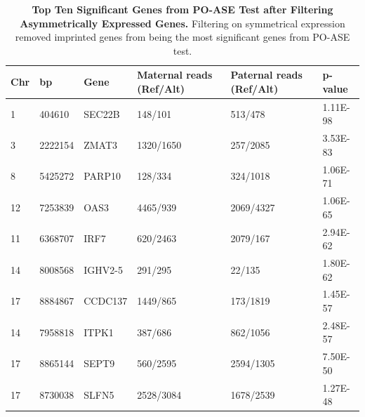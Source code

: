 \begin{table}[!htb]
\centering
\begin{adjustbox}{width={\textwidth}}
\begin{tabular}{@{}p{1cm}p{3cm}p{3cm}p{5cm}p{5cm}p{3cm}@{}}
 \toprule  Chr & bp & Gene & Maternal reads (Ref/Alt) & Paternal reads (Ref/Alt) & p-value \\ \midrule
1 & 404610 & SEC22B & 148/101 & 513/478 & 1.11E-98 \\
3 & 2222154 & ZMAT3 & 1320/1650 & 257/2085 & 3.53E-83\\
8 & 5425272 & PARP10 & 128/334 & 324/1018 & 1.06E-71 \\
12 & 7253839 & OAS3 & 4465/939 & 2069/4327 & 1.06E-65 \\
11 & 6368707 & IRF7 & 620/2463 & 2079/167 & 2.94E-62 \\
14 & 8008568 & IGHV2-5 & 291/295 & 22/135 & 1.80E-62 \\
17 & 8884867 & CCDC137 & 1449/865 & 173/1819 & 1.45E-57\\
14 & 7958818 & ITPK1 & 387/686 & 862/1056 & 2.48E-57\\
17 & 8865144 & SEPT9 & 560/2595 & 2594/1305 & 7.50E-50\\
17 & 8730038 & SLFN5 & 2528/3084 & 1678/2539 & 1.27E-48\\  \bottomrule
\end{tabular}
\end{adjustbox}
\caption[Top Ten Significant Genes from PO-ASE Test after Filtering Asymmetrically Expressed Genes.]{\textbf{Top Ten Significant Genes from PO-ASE Test after Filtering Asymmetrically Expressed Genes.} Filtering on symmetrical expression removed imprinted genes from being the most significant genes from PO-ASE test.}
\label{tab:poase2}
\end{table}



